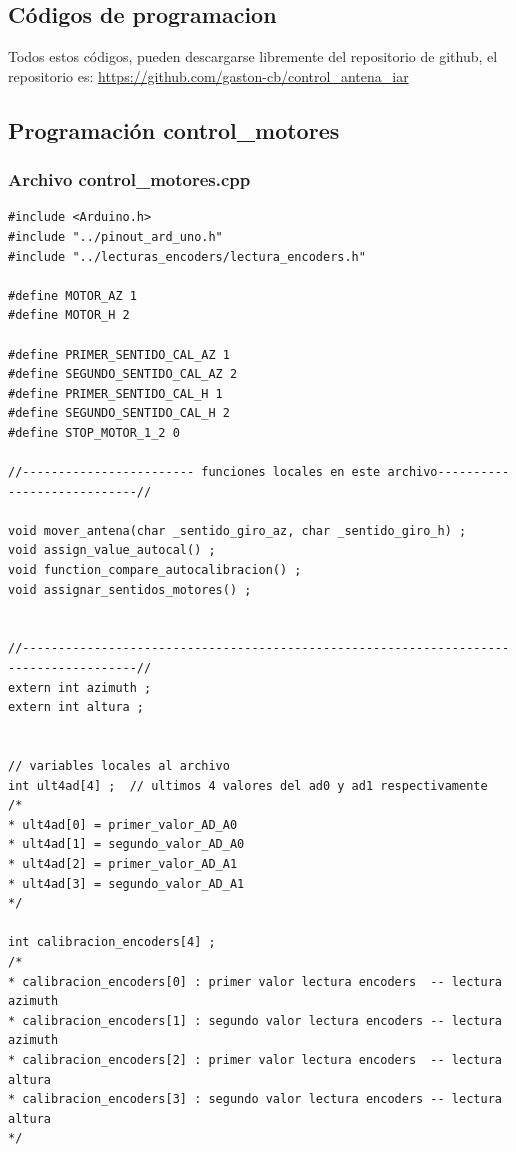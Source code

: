 \begin{appendices}

	\chapter{Códigos de programacion}
	Todos estos códigos, pueden descargarse libremente del repositorio de github, el repositorio es: \url{https://github.com/gaston-cb/control_antena_iar}
	\section{Programación control\_motores} 

	\subsection{Archivo control\_motores.cpp} 


\begin{verbatim}
#include <Arduino.h> 
#include "../pinout_ard_uno.h"
#include "../lecturas_encoders/lectura_encoders.h"

#define MOTOR_AZ 1 
#define MOTOR_H 2 

#define PRIMER_SENTIDO_CAL_AZ 1  
#define SEGUNDO_SENTIDO_CAL_AZ 2  
#define PRIMER_SENTIDO_CAL_H 1  
#define SEGUNDO_SENTIDO_CAL_H 2  
#define STOP_MOTOR_1_2 0 

//------------------------ funciones locales en este archivo----------------------------//  

void mover_antena(char _sentido_giro_az, char _sentido_giro_h) ; 
void assign_value_autocal() ; 
void function_compare_autocalibracion() ; 
void assignar_sentidos_motores() ; 


//--------------------------------------------------------------------------------------// 
extern int azimuth ; 
extern int altura ; 


// variables locales al archivo  
int ult4ad[4] ;  // ultimos 4 valores del ad0 y ad1 respectivamente  
/*
* ult4ad[0] = primer_valor_AD_A0   
* ult4ad[1] = segundo_valor_AD_A0
* ult4ad[2] = primer_valor_AD_A1  
* ult4ad[3] = segundo_valor_AD_A1
*/

int calibracion_encoders[4] ; 
/*
* calibracion_encoders[0] : primer valor lectura encoders  -- lectura azimuth  
* calibracion_encoders[1] : segundo valor lectura encoders -- lectura azimuth 
* calibracion_encoders[2] : primer valor lectura encoders  -- lectura altura
* calibracion_encoders[3] : segundo valor lectura encoders -- lectura altura
*/


\end{verbatim}
\end{appendices}
